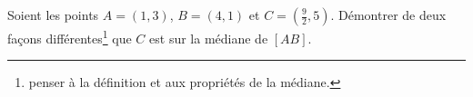 
\begin{exercice}\label{exoSeconde-0010}

    Soient les points \( A=(1,3)\), \( B=(4,1)\) et \( C=(\frac{ 9 }{ 2 },5)\). Démontrer de deux façons différentes\footnote{penser à la définition et aux propriétés de la médiane.} que \( C\) est sur la médiane de \( [AB]\).

\end{exercice}
